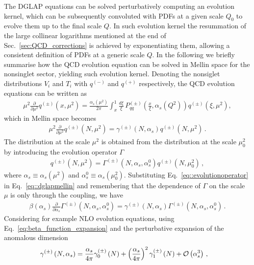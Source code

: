 %
The DGLAP equations can be solved perturbatively computing an evolution kernel, which can be subsequently convoluted
with PDFs at a given scale $Q_0$ to evolve them up to the final scale $Q$.
In such evolution kernel the resummation of the large collinear logarithms mentioned at the end of Sec.~\ref{sec:QCD_corrections}
is achieved by exponentiating them, allowing a consistent definition of PDFs at a generic scale $Q$.
In the following we briefly summarise how the QCD evolution equation can be solved in Mellin space for the
nonsinglet sector, yielding such evolution kernel.
%
Denoting the nonsiglet distributions $V_i$ and $T_i$ with $q^{(-)}$ and
$q^{(+)} $ respectively, the QCD evolution equations can be written as
\begin{align}
    \mu^2\frac{\partial }{\partial \mu^2} q^{(\pm)}\left(x,\mu^2\right) = 
    \frac{\alpha_s(\mu^2)}{2\pi}
    \int_{x}^{1}\frac{d\xi}{\xi}\, 
    P_{qq}^{(\pm)}\left(\frac{x}{\xi},\alpha_s(Q^2)\right)
    q^{(\pm)}\left(\xi,\mu^2\right),
\end{align}
which in Mellin space becomes
\begin{align}
\label{eq::dglapmellin}
    \mu^2\frac{\partial }{\partial \mu^2} q^{(\pm)}\left(N,\mu^2\right) = 
    \gamma^{(\pm)}\left(N, \alpha_s\right) q^{(\pm)}\left(N,\mu^2\right)\, .
\end{align}
The distribution at the scale $\mu^2$ is obtained from the distribution at the
scale $\mu_0^2$ by introducing the evolution operator $\Gamma$
\begin{align}
\label{eq::evolutionoperator}
    q^{(\pm)}\left(N,\mu^2\right) = 
    \Gamma^{(\pm)}\left(N,\alpha_s,\alpha_s^0\right)
    q^{(\pm)}\left(N,\mu_0^2\right)\, ,
\end{align}
where $\alpha_s \equiv \alpha_s\left(\mu^2\right)$ and $\alpha_s^0 \equiv
\alpha_s\left(\mu_0^2\right)$. Substituting Eq.~\eqref{eq::evolutionoperator} in
Eq.~\eqref{eq::dglapmellin} and remembering that the dependence of $\Gamma$ on
the scale $\mu$ is only through the coupling, we have
\begin{align}
\label{eq::Mdglap}
    \beta\left(\alpha_s\right) \frac{\partial}{\partial\alpha_s}
    \Gamma^{(\pm)}\left(N,\alpha_s,\alpha_s^0\right) = 
    \gamma^{(\pm)}\left(N, \alpha_s\right)
    \Gamma^{(\pm)}\left(N,\alpha_s,\alpha_s^0\right)\, .
\end{align}
%
Considering for example NLO evolution equations, using Eq.~\eqref{eq:beta_function_expansion}
and the perturbative expansion of the anomalous dimension 
\begin{align}
    & \gamma^{(\pm)}\left(N, \alpha_s\right) = 
    \frac{\alpha_s}{4\pi} \gamma^{(\pm)}_0\left(N\right) + 
    \left(\frac{\alpha_s}{4\pi}\right)^2 \gamma^{(\pm)}_1\left(N\right) + \mathcal{O}\left( \alpha_s^3 \right)\, ,
\end{align}
